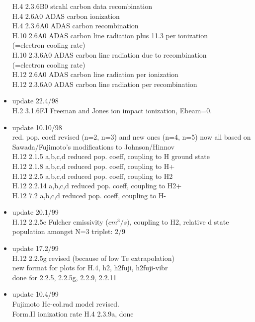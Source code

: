 \documentclass[12pt,dvipdfmx]{article}
\begin{document}
\begin{itemize}
  H.4 2.3.6B0 strahl carbon data recombination \\
  H.4 2.6A0 ADAS  carbon ionization    \\
  H.4 2.3.6A0 ADAS  carbon recombination \\
  H.10 2.6A0 ADAS  carbon line radiation plus 11.3 per ionization\\
                   (=electron cooling rate)\\
  H.10 2.3.6A0 ADAS  carbon line radiation due to recombination\\
                   (=electron cooling rate)\\
  H.12 2.6A0 ADAS  carbon line radiation per ionization\\
  H.12 2.3.6A0 ADAS  carbon line radiation per recombination
 \item update   22.4/98 \\
  H.2  3.1.6FJ  Freeman and Jones ion impact ionization, Ebeam=0.
 \item update   10.10/98 \\
  red. pop. coeff revised (n=2, n=3) and new ones (n=4, n=5)
  now all based on Sawada/Fujimoto's modifications to Johnson/Hinnov\\
  H.12 2.1.5  a,b,c,d  reduced pop. coeff, coupling to H ground state\\
  H.12 2.1.8  a,b,c,d  reduced pop. coeff, coupling to H+\\
  H.12 2.2.5  a,b,c,d  reduced pop. coeff, coupling to H2\\
  H.12 2.2.14 a,b,c,d  reduced pop. coeff, coupling to H2+\\
  H.12 7.2    a,b,c,d  reduced pop. coeff, coupling to H-\\
 \item update   20.1/99 \\
  H.12 2.2.5e Fulcher emissivity ($cm^3/s)$, coupling to H2,
  relative d state population amongst N=3 triplet: 2/9\\
 \item update   17.2/99 \\
  H.12 2.2.5g revised (because of low Te extrapolation)\\
  new format for plots for H.4,  h2, h2fuji, h2fuji-vibr \\
  done for 2.2.5, 2.2.5g, 2.2.9, 2.2.11
 \item update   10.4/99 \\
  Fujimoto He-col.rad model revised.\\
  Form.II      ionization rate          H.4  2.3.9a, done \\

\end{itemize}
\end{document}
